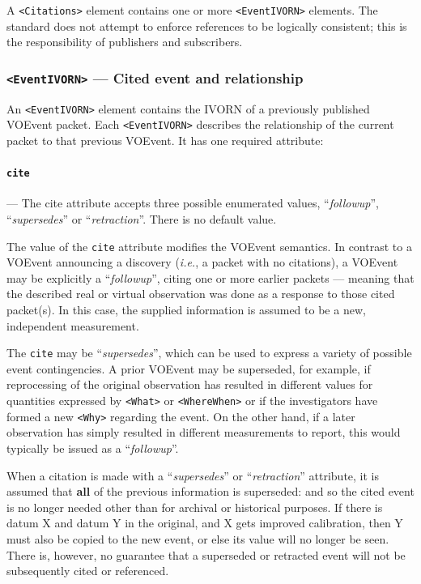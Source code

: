 \documentclass[11pt,a4paper]{ivoa}
\begin{document}
A {\tt <Citations>} element contains one or more {\tt <EventIVORN>} elements. 
The standard does not attempt to enforce references to be logically consistent; 
this is the responsibility of publishers and subscribers. 

\subsubsection{{\tt <EventIVORN>} --- Cited event and relationship}
\label{sec:3.7.1}
An {\tt <EventIVORN>} element contains the IVORN of a previously published 
VOEvent packet. Each {\tt <EventIVORN>} describes the relationship of the 
current packet to that previous VOEvent. It has one required attribute: 

\paragraph{\tt cite}\label{sec:3.7.1.1} --- The {cite} attribute accepts three 
possible enumerated values, ``\emph{followup}'', ``\emph{supersedes}'' or 
``\emph{retraction}''. There is no default value. 

The value of the {\tt cite} attribute modifies the VOEvent semantics. In 
contrast to a VOEvent announcing a discovery (\emph{i.e.}, a packet with no 
citations), a VOEvent may be explicitly a ``\emph{followup}'', citing one or 
more earlier packets --- meaning that the described real or virtual observation 
was done as a response to those cited packet(s). In this case, the supplied 
information is assumed to be a new, independent measurement. 

The {\tt cite} may be ``\emph{supersedes}'', which can be used to express a 
variety of possible event contingencies. A prior VOEvent may be superseded, for 
example, if reprocessing of the original observation has resulted in different 
values for quantities expressed by {\tt <What>} or {\tt <WhereWhen>} or if the 
investigators have formed a new {\tt <Why>} regarding the event. On the other 
hand, if a later observation has simply resulted in different measurements to 
report, this would typically be issued as a ``\emph{followup}''. 

When a citation is made with a ``\emph{supersedes}'' or ``\emph{retraction}'' 
attribute, it is assumed that {\bf all} of the previous information is 
superseded: and so the cited event is no longer needed other than for archival 
or historical purposes. If there is datum X and datum Y in the original, and X 
gets improved calibration, then Y must also be copied to the new event, or else 
its value will no longer be seen. There is, however, no guarantee that a 
superseded or retracted event will not be subsequently cited or referenced. 
\end{document}
